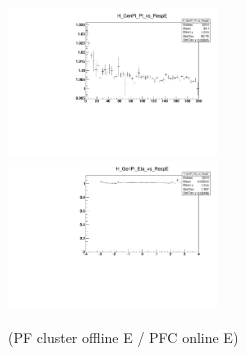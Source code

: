 
\begin{figure}
\includegraphics[width=0.495\textwidth]{./plots_pdf/ECAL_plots/Prod6/NoPU/H_GenPi_Pt_vs_RespE.pdf}
\includegraphics[width=0.495\textwidth]{./plots_pdf/ECAL_plots/Prod6/NoPU/H_GenPi_Eta_vs_RespE.pdf}
\caption{(PF cluster offline E / PFC online E)}
\label{fig:NoPU_ECAL_Offline_vs_Online_E}
\end{figure}

